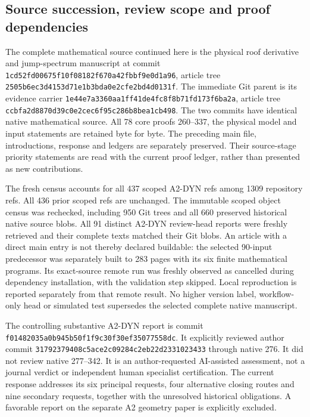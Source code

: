 \documentclass[11pt,reqno]{amsart}
\numberwithin{equation}{section}
\theoremstyle{definition}\newtheorem{definition}[theorem]{Definition}
\theoremstyle{remark}\newtheorem{remark}[theorem]{Remark}
\begin{document}
\subsection*{Source succession, review scope and proof dependencies}
The complete mathematical source continued here is the physical
roof derivative and jump-spectrum manuscript at commit
\texttt{1cd52fd0\allowbreak{}0675f10f\allowbreak{}08182f67\allowbreak{}0a42fbbf\allowbreak{}9e0d1a96},
article tree
\texttt{2505b6ec\allowbreak{}3d4153d7\allowbreak{}1e1b3bda\allowbreak{}0e2cfe2b\allowbreak{}d4d0131f}.
The immediate Git parent is its evidence carrier
\texttt{1e44e7a3\allowbreak{}360aa1ff\allowbreak{}41de4fc8\allowbreak{}f8b71fd1\allowbreak{}73f6ba2a},
article tree
\texttt{ccbfa2d8\allowbreak{}870d39c0\allowbreak{}e2cec6f9\allowbreak{}5c286b8b\allowbreak{}ea1cb498}.
The two commits have identical native mathematical source.
All 78 core proofs 260--337, the physical model and input
statements are retained byte for byte. The preceding main file,
introductions, response and ledgers are separately preserved.
Their source-stage priority statements are read with the current
proof ledger, rather than presented as new contributions.

The fresh census accounts for all 437 scoped A2-DYN refs among
1309 repository refs. All 436 prior scoped refs are unchanged.
The immutable scoped object census was rechecked, including
950 Git trees and all 660 preserved historical native source
blobs. All 91 distinct A2-DYN review-head reports were freshly
retrieved and their complete texts matched their Git blobs.
An article with a direct main entry is not thereby declared
buildable: the selected 90-input predecessor was separately
built to 283 pages with its six finite mathematical programs.
Its exact-source remote run was freshly observed as cancelled
during dependency installation, with the validation step skipped.
Local reproduction is reported separately from that remote result.
No higher version label, workflow-only head or simulated test
supersedes the selected complete native manuscript.

The controlling substantive A2-DYN report is commit
\texttt{f0148203\allowbreak{}5a0b945b\allowbreak{}50f1f9c3\allowbreak{}0f30ef35\allowbreak{}077558dc}.
It explicitly reviewed author commit
\texttt{31792379\allowbreak{}408c5ace\allowbreak{}2c09284c\allowbreak{}2eb22d23\allowbreak{}31023433}
through native 276. It did not review native 277--342.
It is an author-requested AI-assisted assessment, not a journal
verdict or independent human specialist certification. The
current response addresses its six principal requests, four
alternative closing routes and nine secondary requests, together
with the unresolved historical obligations. A favorable report
on the separate A2 geometry paper is explicitly excluded.
\end{document}
